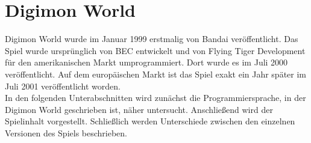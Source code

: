 \section{Digimon World}\label{sec:dw1}
Digimon World wurde im Januar 1999 erstmalig von Bandai veröffentlicht\cite{mobygames}. Das Spiel wurde ursprünglich von BEC entwickelt und von Flying Tiger Development für den amerikanischen Markt umprogrammiert\cite{lineup}\cite{flyingtiger}. Dort wurde es im Juli 2000 veröffentlicht. Auf dem europäischen Markt ist das Spiel exakt ein Jahr später im Juli 2001 veröffentlicht worden.\\

In den folgenden Unterabschnitten wird zunächst die Programmiersprache, in der Digimon World geschrieben ist, näher untersucht. Anschließend wird der Spielinhalt vorgestellt. Schließlich werden Unterschiede zwischen den einzelnen Versionen des Spiels beschrieben.\\


